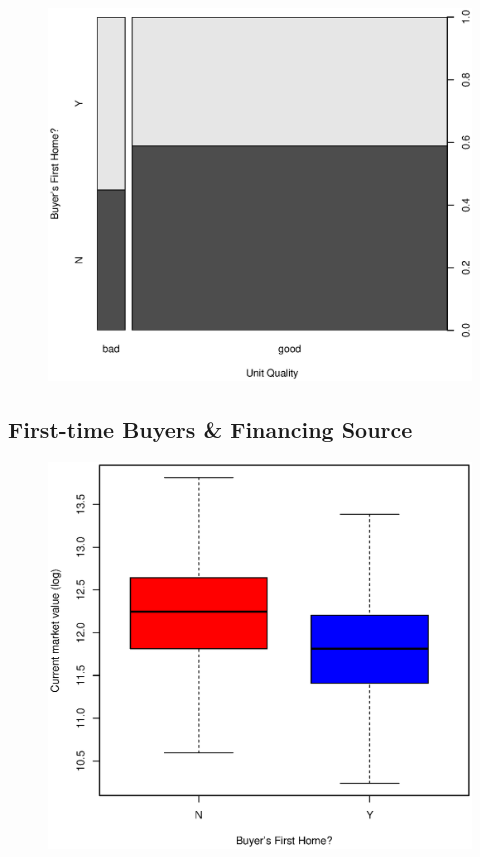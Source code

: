 \documentclass[11pt, fleqn]{article}
\begin{document}
\begin{figure}[!htb]
  \centering
  \includegraphics[scale=.5]{first_home_vs_home_quality.eps}
  \caption{}
  \label{fig:first_qual}
\end{figure}

\subsection{First-time Buyers \& Financing Source}

\begin{figure}[!htb]
  \centering
  \includegraphics[scale=.5]{frstho.eps}
  \caption{}
  \label{fig:frstho}
\end{figure}
\end{document}
